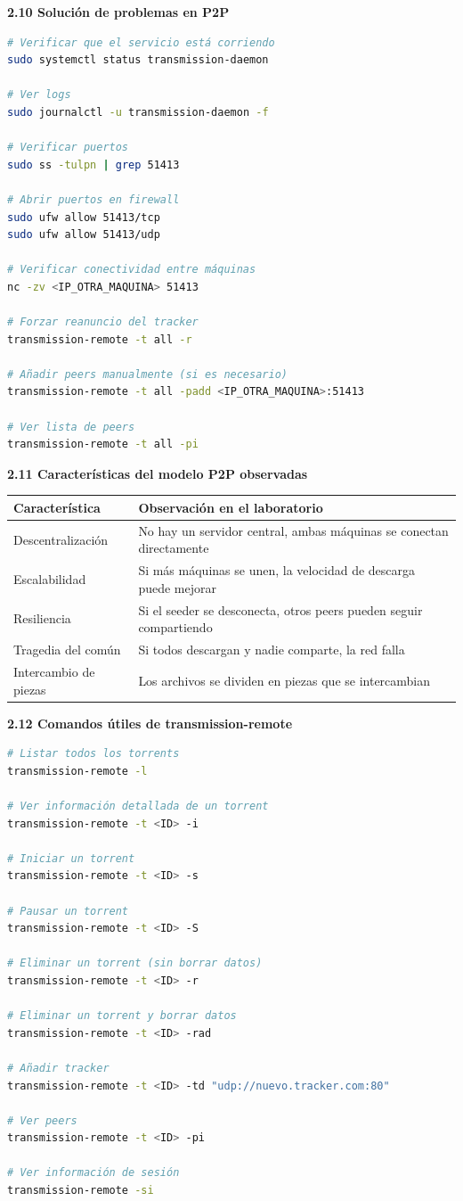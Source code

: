 \documentclass[stu, 12pt, letterpaper, donotrepeattitle, floatsintext, noapacite]{apa7}
\begin{document}
\textbf{2.10 Solución de problemas en P2P}
\begin{lstlisting}[language=bash]
# Verificar que el servicio está corriendo
sudo systemctl status transmission-daemon

# Ver logs
sudo journalctl -u transmission-daemon -f

# Verificar puertos
sudo ss -tulpn | grep 51413

# Abrir puertos en firewall
sudo ufw allow 51413/tcp
sudo ufw allow 51413/udp

# Verificar conectividad entre máquinas
nc -zv <IP_OTRA_MAQUINA> 51413

# Forzar reanuncio del tracker
transmission-remote -t all -r

# Añadir peers manualmente (si es necesario)
transmission-remote -t all -padd <IP_OTRA_MAQUINA>:51413

# Ver lista de peers
transmission-remote -t all -pi
\end{lstlisting}

\textbf{2.11 Características del modelo P2P observadas}

\begin{table}[h]
\centering
\begin{tabular}{|p{4cm}|p{10cm}|}
\hline
\textbf{Característica} & \textbf{Observación en el laboratorio} \\ \hline
Descentralización & No hay un servidor central, ambas máquinas se conectan directamente \\ \hline
Escalabilidad & Si más máquinas se unen, la velocidad de descarga puede mejorar \\ \hline
Resiliencia & Si el seeder se desconecta, otros peers pueden seguir compartiendo \\ \hline
Tragedia del común & Si todos descargan y nadie comparte, la red falla \\ \hline
Intercambio de piezas & Los archivos se dividen en piezas que se intercambian \\ \hline
\end{tabular}
\end{table}

\textbf{2.12 Comandos útiles de transmission-remote}
\begin{lstlisting}[language=bash]
# Listar todos los torrents
transmission-remote -l

# Ver información detallada de un torrent
transmission-remote -t <ID> -i

# Iniciar un torrent
transmission-remote -t <ID> -s

# Pausar un torrent
transmission-remote -t <ID> -S

# Eliminar un torrent (sin borrar datos)
transmission-remote -t <ID> -r

# Eliminar un torrent y borrar datos
transmission-remote -t <ID> -rad

# Añadir tracker
transmission-remote -t <ID> -td "udp://nuevo.tracker.com:80"

# Ver peers
transmission-remote -t <ID> -pi

# Ver información de sesión
transmission-remote -si
\end{lstlisting}
\end{document}
